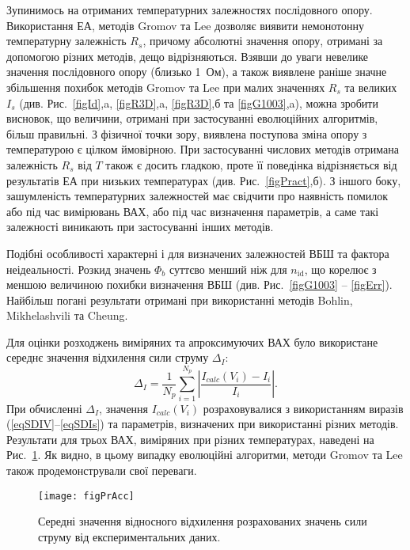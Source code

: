 Зупинимось на отриманих температурних залежностях послідовного опору.
Використання ЕА, методів Gromov та Lee дозволяє виявити немонотонну температурну залежність $R_s$, причому абсолютні значення опору, отримані за допомогою різних методів, дещо відрізняються.
Взявши до уваги невелике значення послідовного опору (близько 1~Ом), а також виявлене раніше значне збільшення похибок методів Gromov та Lee при малих значеннях $R_s$ та великих $I_s$ (див. Рис.~\ref{figId},a, \ref{figR3D},a, \ref{figR3D},б та \ref{figG1003},a), можна зробити висновок, що величини, отримані при застосуванні еволюційних алгоритмів, більш правильні.
З фізичної точки зору, виявлена поступова зміна опору з температурою є цілком ймовірною.
При застосуванні числових методів отримана залежність $R_s$ від $T$ також є досить гладкою, проте її поведінка відрізняється від результатів ЕА при низьких температурах (див. Рис.~\ref{figPract},б).
З іншого боку, зашумленість температурних залежностей має свідчити про наявність помилок або під час вимірювань ВАХ, або під час визначення параметрів, а саме такі залежності виникають при застосуванні інших методів.

Подібні особливості характерні і для визначених залежностей ВБШ та фактора неідеальності.
Розкид значень $\Phi_b$ суттєво менший ніж для $n_\mathrm{id}$, що корелює з меншою величиною похибки визначення ВБШ (див. Рис.~\ref{figG1003} -- \ref{figErr}).
Найбільш погані результати отримані при використанні методів Bohlin, Mikhelashvili та Cheung.

Для оцінки розходжень виміряних та апроксимуючих ВАХ було використане середнє значення відхилення сили струму $\Delta_I$:
 \begin{equation}
 \label{eqMCur}
 \Delta_I=\frac{1}{N_p}\sum_{i=1}^{N_p}\left|\frac{I_{calc}(V_i)-I_i}{I_i}\right|.
 \end{equation}
При обчисленні $\Delta_I$, значення $I_{calc}(V_i)$ розраховувалися з використанням виразів (\ref{eqSDIV}--\ref{eqSDIs}) та параметрів, визначених при використанні різних методів.
Результати для трьох ВАХ, виміряних при різних температурах, наведені на Рис.~\ref{figPrAcc}.
Як видно, в цьому випадку еволюційні алгоритми, методи Gromov та Lee також продемонстрували свої переваги.


\begin{figure}
\center
\texttt{[image: figPrAcc]}%
\caption{\label{figPrAcc}
Середні значення відносного відхилення розрахованих значень сили струму від експериментальних даних.
}
\end{figure}

